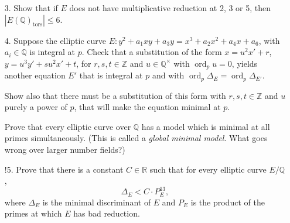 \documentclass[a4paper]{article}
\theoremstyle{definition}
\DeclareMathOperator{\ord}{ord}
\newcommand{\tors}{\mathrm{tors}}
\renewcommand{\O}{\mathcal{O}}
\newcommand{\F}{\mathbb{F}}
\newcommand{\Z}{\mathbb{Z}}
\newcommand{\Q}{\mathbb{Q}}
\newcommand{\R}{\mathbb{R}}
\begin{document}
\begin{enumerate}
        \begin{proof}[Solution]
            We have good reduction at 2, where the derivative of $y^2+y$ is a
            non-zero constant, and also at 3, where the derivative of $x^3-x$ is
            a non-zero constant. Writing $E$ for the given curve, we have
            \begin{align*}
                \tilde E(\F_2)
                    &= \{\O\}\cup\{(x,y)\in\F_2^2:y^2+y=x^3+x\} \\
                    &= \{\O\}\cup\F_2^2
            \end{align*}
            since $y^2+y=0=x^3+x$ for $x,y\in\F_2$, so we get
            $\tilde E(\F_2)\cong C_5$. Also
            \begin{align*}
                \tilde E(\F_3)
                    &= \{\O\}\cup\{(x,y)\in\F_3^2:y(y+1)=x^3-x\} \\
                    &= \{\O\}\cup\bigl(\{0,-1\}\times\F_3\bigr)
            \end{align*}
            since $x^3-x=0$ for $x\in\F_3$, so we get $\tilde E(\F_3)\cong C_7$.
            Hence by Corollary 38 we have only 2-torsion;
            $E(\Q)_\tors=E(\Q)_\tors[2]$. But the points of order 2 are given by
            $y=-\frac{1}{2}$ and $x^3-x-\frac{1}{4}=0$, and this cubic in $x$
            has no rational roots. Therefore $E(\Q)_\tors$ is trivial, so the
            point $(0,-1)\in E(\Q)$ is non-torsion, and hence $E(\Q)$ is
            infinite.
        \end{proof}

    \item[3.] Show that if $E$ does not have multiplicative reduction at 2, 3 or
        5, then $|E(\Q)_\tors|\le6$.

    \item[4.] Suppose the elliptic curve $E:y^2+a_1xy+a_3y=x^3+a_2x^2+a_4x+a_6$,
        with $a_i\in\Q$ is integral at $p$. Check that a substitution of the
        form $x=u^2x'+r$, $y=u^3y'+su^2x'+t$, for $r,s,t\in\Z$ and
        $u\in\Q^\times$ with $\ord_pu=0$, yields another equation $E'$ that is
        integral at $p$ and with $\ord_p\Delta_E=\ord_p\Delta_{E'}$.

        Show also that there must be a substitution of this form with
        $r,s,t\in\Z$ and $u$ purely a power of $p$, that will make the equation
        minimal at $p$.

        Prove that every elliptic curve over $\Q$ has a model which is minimal
        at all primes simultaneously. (This is called a \emph{global minimal
        model}. What goes wrong over larger number fields?)

    \item[!5.] Prove that there is a constant $C\in\R$ such that for every
        elliptic curve $E/\Q$,
        \begin{equation*}
            \Delta_E<C\cdot P_E^{13},
        \end{equation*}
        where $\Delta_E$ is the minimal discriminant of $E$ and $P_E$ is the
        product of the primes at which $E$ has bad reduction.
\end{enumerate}
\end{document}
